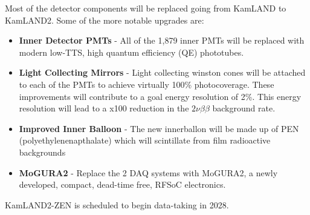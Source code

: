 Most of the detector components will be replaced going from KamLAND to KamLAND2. Some of the more notable upgrades are:
\begin{itemize}
	\item \textbf{Inner Detector PMTs} - All of the 1,879 inner PMTs will be replaced with modern low-TTS, high quantum efficiency (QE) phototubes. 
	\item \textbf{Light Collecting Mirrors} - Light collecting winston cones will be attached to each of the PMTs to achieve virtually 100\% photocoverage. These improvements will contribute to a goal energy resolution of 2\%. This energy resolution will lead to a x100 reduction in the $2\nu\beta\beta$ background rate.
	\item \textbf{Improved Inner Balloon} - The new innerballon will be made up of PEN (polyethylenenapthalate) which will scintillate from film radioactive backgrounds
	\item \textbf{MoGURA2} - Replace the 2 DAQ systems with MoGURA2, a newly developed, compact, dead-time free, RFSoC electronics.
\end{itemize}
KamLAND2-ZEN is scheduled to begin data-taking in 2028.



